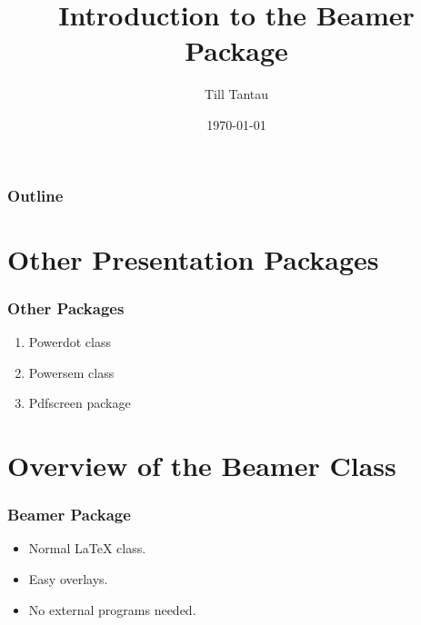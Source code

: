 \documentclass{beamer}
\begin{document}
	\title{Introduction to the Beamer Package}
	\author{Till Tantau}
	\date{\today}
	\begin{frame}
	\titlepage
	\end{frame}
	\begin{frame}
	\frametitle{Outline}
	\tableofcontents
	\end{frame}
	\section{Other Presentation Packages}
	\begin{frame}
	\frametitle{Other Packages}
	\begin{enumerate}
	\item Powerdot class
	\item Powersem class
	\item Pdfscreen package
	\end{enumerate}
	\end{frame}
	\section{Overview of the Beamer Class}
	\begin{frame}\frametitle{Beamer Package}
	\begin{itemize}
	\item Normal LaTeX class.
	\item Easy overlays.
	\item No external programs needed.
	\end{itemize}
	\end{frame}
	
\end{document}
